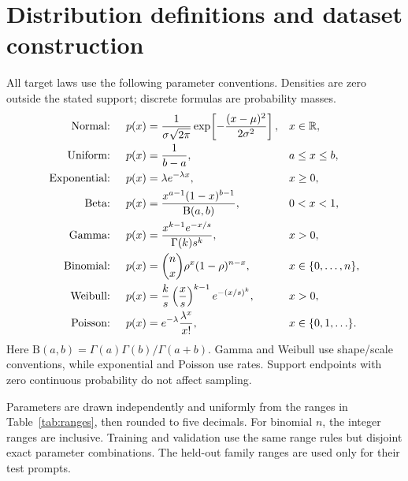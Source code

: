 \section{Distribution definitions and dataset construction}
\label{app:distributions}
All target laws use the following parameter conventions. Densities are zero
outside the stated support; discrete formulas are probability masses.
\begin{align}
 \text{Normal: }\quad
 p(x)&=\frac{1}{\sigma\sqrt{2\pi}}
       \exp\!\left[-\frac{(x-\mu)^2}{2\sigma^2}\right],
       &&x\in\mathbb{R},\\
 \text{Uniform: }\quad p(x)&=\frac{1}{b-a},&&a\leq x\leq b,\\
 \text{Exponential: }\quad p(x)&=\lambda e^{-\lambda x},&&x\geq0,\\
 \text{Beta: }\quad p(x)&=\frac{x^{a-1}(1-x)^{b-1}}{\mathrm B(a,b)},
       &&0<x<1,\\
 \text{Gamma: }\quad p(x)&=\frac{x^{k-1}e^{-x/s}}{\Gamma(k)s^k},&&x>0,\\
 \text{Binomial: }\quad p(x)&=\binom{n}{x}\rho^x(1-\rho)^{n-x},
       &&x\in\{0,\ldots,n\},\\
 \text{Weibull: }\quad p(x)&=\frac{k}{s}\left(\frac{x}{s}\right)^{k-1}
                e^{-(x/s)^k},&&x>0,\\
 \text{Poisson: }\quad p(x)&=e^{-\lambda}\frac{\lambda^x}{x!},
       &&x\in\{0,1,\ldots\}.
\end{align}
Here $\mathrm B(a,b)=\Gamma(a)\Gamma(b)/\Gamma(a+b)$. Gamma and Weibull
use shape/scale conventions, while exponential and Poisson use rates.
Support endpoints with zero continuous probability do not affect sampling.

Parameters are drawn independently and uniformly from the ranges in
Table~\ref{tab:ranges}, then rounded to five decimals. For binomial $n$,
the integer ranges are inclusive. Training and validation use the same
range rules but disjoint exact parameter combinations. The held-out
family ranges are used only for their test prompts.

